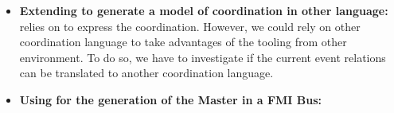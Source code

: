 \begin{itemize}
	\item \textbf{Extending \bcool to generate a model of coordination in other language:} \bcool relies on \ccsl to express the coordination. However, we could rely on other coordination language to take advantages of the tooling from other environment. To do so, we have to investigate if the current event relations can be translated to another coordination language.
	
	\item \textbf{Using \bcool for the generation of the Master in a FMI Bus:} 
\end{itemize}
